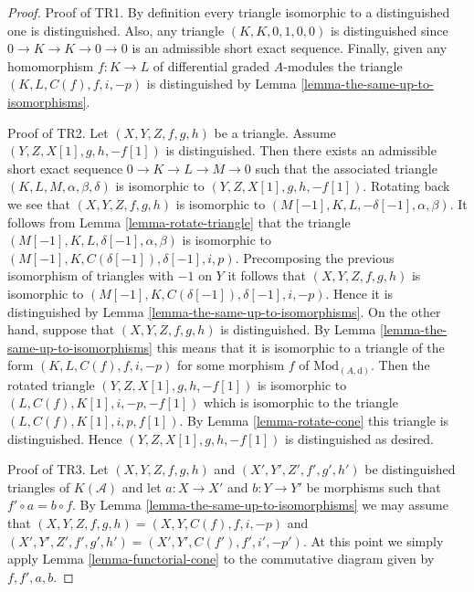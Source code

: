 \documentclass[10pt,a4paper]{amsart}
\theoremstyle{plain}
\theoremstyle{definition}
\theoremstyle{remark}
\numberwithin{equation}{subsection}
\begin{document}
\begin{proof}
Proof of TR1. By definition every triangle isomorphic to a distinguished
one is distinguished. Also, any triangle $(K, K, 0, 1, 0, 0)$
is distinguished since $0 \to K \to K \to 0 \to 0$ is
an admissible short exact sequence. Finally, given any homomorphism
$f : K \to L$ of differential graded $A$-modules the triangle
$(K, L, C(f), f, i, -p)$ is distinguished by
Lemma \ref{lemma-the-same-up-to-isomorphisms}.

\medskip\noindent
Proof of TR2. Let $(X, Y, Z, f, g, h)$ be a triangle.
Assume $(Y, Z, X[1], g, h, -f[1])$ is distinguished.
Then there exists an admissible short exact sequence
$0 \to K \to L \to M \to 0$ such that the associated
triangle $(K, L, M, \alpha, \beta, \delta)$
is isomorphic to $(Y, Z, X[1], g, h, -f[1])$. Rotating back we see
that $(X, Y, Z, f, g, h)$ is isomorphic to
$(M[-1], K, L, -\delta[-1], \alpha, \beta)$.
It follows from Lemma \ref{lemma-rotate-triangle} that the triangle
$(M[-1], K, L, \delta[-1], \alpha, \beta)$
is isomorphic to
$(M[-1], K, C(\delta[-1]), \delta[-1], i, p)$.
Precomposing the previous isomorphism of triangles with $-1$ on $Y$
it follows that $(X, Y, Z, f, g, h)$ is isomorphic to
$(M[-1], K, C(\delta[-1]), \delta[-1], i, -p)$.
Hence it is distinguished by
Lemma \ref{lemma-the-same-up-to-isomorphisms}.
On the other hand, suppose that $(X, Y, Z, f, g, h)$ is distinguished.
By Lemma \ref{lemma-the-same-up-to-isomorphisms} this means that it is
isomorphic to a triangle of the form
$(K, L, C(f), f, i, -p)$ for some morphism $f$ of
$\text{Mod}_{(A, \text{d})}$. Then the rotated triangle
$(Y, Z, X[1], g, h, -f[1])$ is
isomorphic to $(L, C(f), K[1], i, -p, -f[1])$ which is
isomorphic to the triangle
$(L, C(f), K[1], i, p, f[1])$.
By Lemma \ref{lemma-rotate-cone} this triangle is distinguished.
Hence $(Y, Z, X[1], g, h, -f[1])$ is distinguished as desired.

\medskip\noindent
Proof of TR3. Let $(X, Y, Z, f, g, h)$ and $(X', Y', Z', f', g', h')$
be distinguished triangles of $K(\mathcal{A})$ and let $a : X \to X'$
and $b : Y \to Y'$ be morphisms such that $f' \circ a = b \circ f$. By
Lemma \ref{lemma-the-same-up-to-isomorphisms} we may assume that
$(X, Y, Z, f, g, h) = (X, Y, C(f), f, i, -p)$ and
$(X', Y', Z', f', g', h') = (X', Y', C(f'), f', i', -p')$.
At this point we simply apply Lemma \ref{lemma-functorial-cone}
to the commutative diagram given by $f, f', a, b$.
\end{proof}
\end{document}
